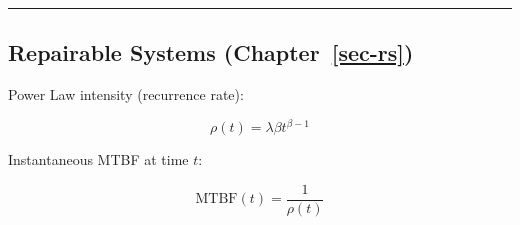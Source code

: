 \documentclass[
  letterpaper,
  DIV=11,
  numbers=noendperiod]{scrreprt}
\begin{document}
\begin{center}\rule{0.5\linewidth}{0.5pt}\end{center}

\subsection*{\texorpdfstring{Repairable Systems
(Chapter~\ref{sec-rs})}{Repairable Systems (Chapter~)}}\label{repairable-systems-sec-rs}

Power Law intensity (recurrence rate):

\[\rho(t) = \lambda \beta t^{\beta - 1}\]

Instantaneous MTBF at time \(t\):

\[\text{MTBF}(t) = \frac{1}{\rho(t)}\]
\end{document}
